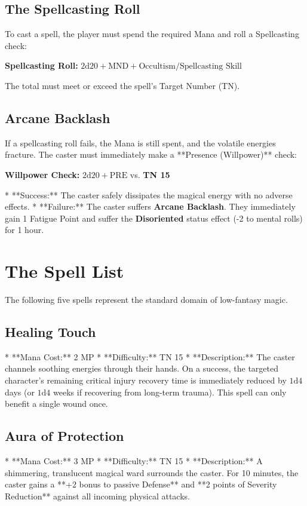 \subsection{The Spellcasting Roll}
To cast a spell, the player must spend the required Mana and roll a Spellcasting check:
\begin{center}
    \textbf{Spellcasting Roll:} $2\text{d}20 + \text{MND} + \text{Occultism/Spellcasting Skill}$
\end{center}
The total must meet or exceed the spell's Target Number (TN).

\subsection{Arcane Backlash}
If a spellcasting roll fails, the Mana is still spent, and the volatile energies fracture. The caster must immediately make a **Presence (Willpower)** check:
\begin{center}
    \textbf{Willpower Check:} $2\text{d}20 + \text{PRE}$ vs. \textbf{TN 15}
\end{center}
*   **Success:** The caster safely dissipates the magical energy with no adverse effects.
*   **Failure:** The caster suffers \textbf{Arcane Backlash}. They immediately gain 1 Fatigue Point and suffer the \textbf{Disoriented} status effect (-2 to mental rolls) for 1 hour.

\section{The Spell List}

The following five spells represent the standard domain of low-fantasy magic.

\subsection{Healing Touch}
*   **Mana Cost:** 2 MP
*   **Difficulty:** TN 15
*   **Description:** The caster channels soothing energies through their hands. On a success, the targeted character's remaining critical injury recovery time is immediately reduced by $1\text{d}4$ days (or $1\text{d}4$ weeks if recovering from long-term trauma). This spell can only benefit a single wound once.

\subsection{Aura of Protection}
*   **Mana Cost:** 3 MP
*   **Difficulty:** TN 15
*   **Description:** A shimmering, translucent magical ward surrounds the caster. For 10 minutes, the caster gains a **+2 bonus to passive Defense** and **2 points of Severity Reduction** against all incoming physical attacks.

